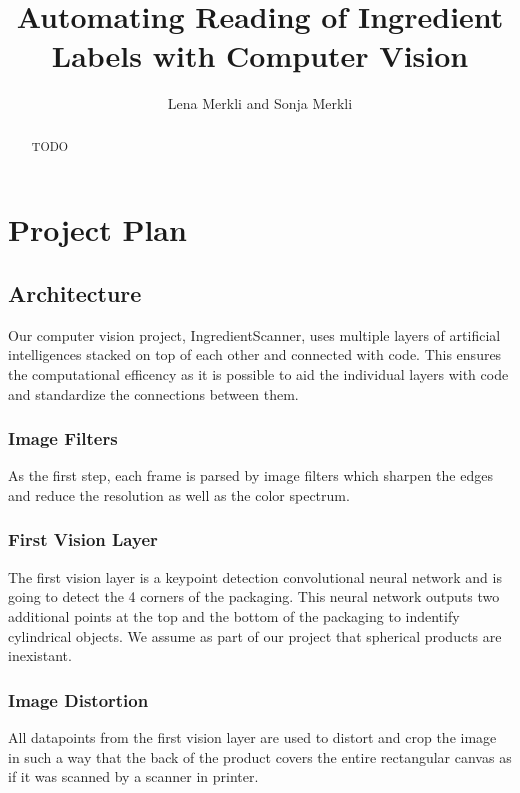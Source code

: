 \documentclass[a4paper,11pt]{report}
\title{Automating Reading of Ingredient Labels with Computer Vision}
\author{Lena Merkli and Sonja Merkli}
\begin{document}
    \maketitle
    \begin{abstract}
        TODO
    \end{abstract}
    \tableofcontents

    \chapter{Project Plan}

        \section{Architecture}
                Our computer vision project, IngredientScanner, uses multiple layers of artificial intelligences stacked on top of each other and connected with code. This ensures the computational efficency as it is possible to aid the individual layers with code and standardize the connections between them.

            \subsection{Image Filters}
                As the first step, each frame is parsed by image filters which sharpen the edges and reduce the resolution as well as the color spectrum.

            \subsection{First Vision Layer}
                The first vision layer is a keypoint detection convolutional neural network and is going to detect the 4 corners of the packaging. This neural network outputs two additional points at the top and the bottom of the packaging to indentify cylindrical objects. We assume as part of our project that spherical products are inexistant.

            \subsection{Image Distortion}
                All datapoints from the first vision layer are used to distort and crop the image in such a way that the back of the product covers the entire rectangular canvas as if it was scanned by a scanner in printer.
\end{document}
